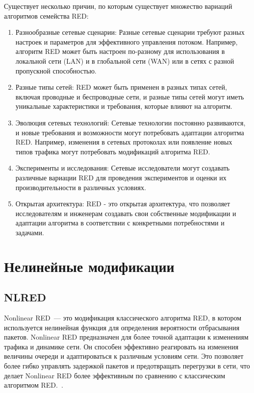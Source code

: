 Существует несколько причин, по которым существует множество вариаций алгоритмов семейства RED:

\begin{enumerate}
\item Разнообразные сетевые сценарии: Разные сетевые сценарии требуют разных настроек и параметров для эффективного управления потоком. Например, алгоритм RED может быть настроен по-разному для использования в локальной сети (LAN) и в глобальной сети (WAN) или в сетях с разной пропускной способностью.
\item Разные типы сетей: RED может быть применен в разных типах сетей, включая проводные и беспроводные сети, и разные типы сетей могут иметь уникальные характеристики и требования, которые влияют на алгоритм.
\item Эволюция сетевых технологий: Сетевые технологии постоянно развиваются, и новые требования и возможности могут потребовать адаптации алгоритма RED. Например, изменения в сетевых протоколах или появление новых типов трафика могут потребовать модификаций алгоритма RED.
\item Эксперименты и исследования: Сетевые исследователи могут создавать различные вариации RED для проведения экспериментов и оценки их производительности в различных условиях.
\item Открытая архитектура: RED - это открытая архитектура, что позволяет исследователям и инженерам создавать свои собственные модификации и адаптации алгоритма в соответствии с конкретными потребностями и задачами.
\end{enumerate}


\section{Нелинейные модификации}
\label{chap2:sec2}

\subsection{NLRED}

Nonlinear RED~--- это модификация классического алгоритма RED, в
котором используется нелинейная функция для определения
вероятности отбрасывания пакетов. Nonlinear RED предназначен для более точной адаптации к изменениям трафика и динамике сети. 
Он способен эффективно реагировать на изменения величины очереди и адаптироваться к различным условиям сети. 
Это позволяет более гибко управлять задержкой пакетов и предотвращать перегрузки в сети, 
что делает Nonlinear RED более эффективным по сравнению с классическим алгоритмом RED.~\cite{NLRED1, NLRED2}.   


